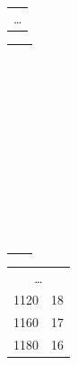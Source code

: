 \begin{table}
\begin{tabular}{c|c}
\multicolumn{2}{c}{\dots}\\
\end{tabular}
\begin{tabular}{c|c}
              &           \\&\\&\\&\\&\\&\\&\\&\\&\\&\\&\\&\\&\\&\\&\\&\\&\\&\\&\\&\\&\\&\\&\\&\\&\\&\\&\\&\\&\\&\\&\\&\\&\\&\\&\\&\\&\\&\\&\\&\\&\\&\\&\\&\\

\end{tabular}
\begin{tabular}{c|c} 
\multicolumn{2}{c}{\dots}\\

1120&	18\\

1160&	17\\ 

1180&	16\\ 


\end{tabular}
\end{table}
